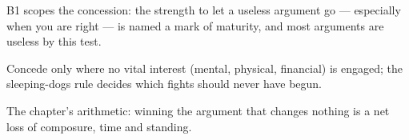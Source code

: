 

\begin{distilled}
  \item B1 scopes the concession: the strength to let a useless argument go --- especially when you are right --- is named a mark of maturity, and most arguments are useless by this test.
  \item Concede only where no vital interest (mental, physical, financial) is engaged; the sleeping-dogs rule decides which fights should never have begun.
  \item The chapter's arithmetic: winning the argument that changes nothing is a net loss of composure, time and standing.
\end{distilled}
